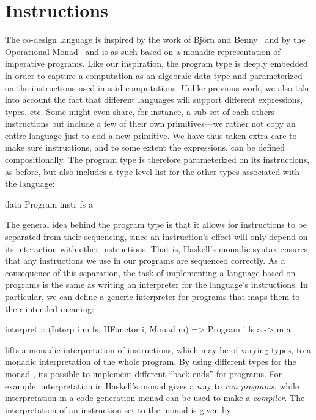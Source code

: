\documentclass[../paper.tex]{subfiles}
\begin{document}
\section{Instructions}
\label{instr}

The co-design language is inspired by the work of Björn and Benny~\cite{BjornBenny} and by the Operational Monad~\cite{Operational} and is as such based on a monadic representation of imperative programs. Like our inspiration, the program type is deeply embedded in order to capture a computation as an algebraic data type and parameterized on the instructions used in said computations. Unlike previous work, we also take into account the fact that different languages will support different expressions, types, etc. Some might even share, for instance, a sub-set of each others instructions but include a few of their own primitives---we rather not copy an entire language just to add a new primitive. We have thus taken extra care to make sure instructions, and to some extent the expressions, can be defined compositionally. The program type is therefore parameterized on its instructions, as before, but also includes a type-level list for the other types associated with the language:

\begin{code}
data Program instr fs a
\end{code}

The general idea behind the program type is that it allows for instructions to be separated from their sequencing, since an instruction's effect will only depend on its interaction with other instructions. That is, Haskell's monadic syntax ensures that any instructions we use in our programs are sequenced correctly. As a consequence of this separation, the task of implementing a language based on programs is the same as writing an interpreter for the language's instructions. In particular, we can define a generic interpreter for programs that maps them to their intended meaning:

\begin{code}
interpret :: (Interp i m fs, HFunctor i, Monad m) => Program i fs a -> m a
\end{code}

 lifts a monadic interpretation of instructions, which may be of varying types, to a monadic interpretation of the whole program. By using different types for the monad , its possible to implement different ``back ends'' for programs. For example, interpretation in Haskell's  monad gives a way to \emph{run programs}, while interpretation in a code generation monad can be used to make a \emph{compiler}. The interpretation of an instruction set  to the monad  is given by :
\end{document}
